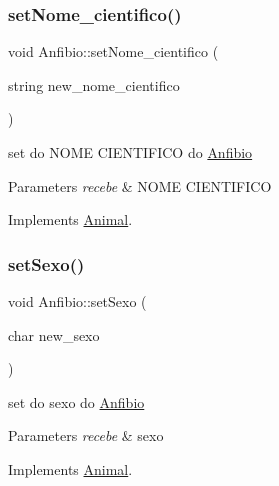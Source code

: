 \subsubsection{\texorpdfstring{setNome\_cientifico()}{setNome\_cientifico()}}
{\footnotesize\ttfamily void Anfibio\+::set\+Nome\+\_\+cientifico (\begin{DoxyParamCaption}\item[{string}]{new\+\_\+nome\+\_\+cientifico }\end{DoxyParamCaption})\hspace{0.3cm}{\ttfamily [virtual]}}



set do N\+O\+ME C\+I\+E\+N\+T\+I\+F\+I\+CO do \mbox{\hyperlink{class_anfibio}{Anfibio}} 


\begin{DoxyParams}{Parameters}
{\em recebe} & N\+O\+ME C\+I\+E\+N\+T\+I\+F\+I\+CO \\
\hline
\end{DoxyParams}


Implements \mbox{\hyperlink{class_animal}{Animal}}.

\mbox{\label{class_anfibio_aa69452680e389f817fe2d9761c6322f4}} 
\subsubsection{\texorpdfstring{setSexo()}{setSexo()}}
{\footnotesize\ttfamily void Anfibio\+::set\+Sexo (\begin{DoxyParamCaption}\item[{char}]{new\+\_\+sexo }\end{DoxyParamCaption})\hspace{0.3cm}{\ttfamily [virtual]}}



set do sexo do \mbox{\hyperlink{class_anfibio}{Anfibio}} 


\begin{DoxyParams}{Parameters}
{\em recebe} & sexo \\
\hline
\end{DoxyParams}


Implements \mbox{\hyperlink{class_animal}{Animal}}.

\mbox{\label{class_anfibio_a670cf19d6d6423bdf1cac6bcbea97354}} 
